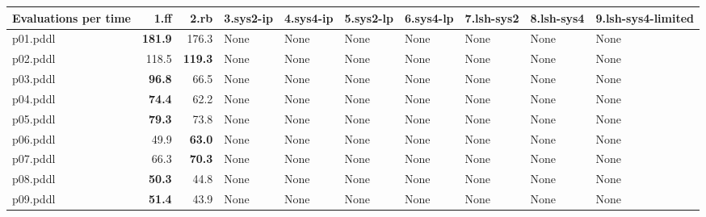 \documentclass{article}
\begin{document}
\begin{tabular}{@{}lrrrrrrrrr@{}}
Evaluations per time & 1.ff & 2.rb & 3.sys2-ip & 4.sys4-ip & 5.sys2-lp & 6.sys4-lp & 7.lsh-sys2 & 8.lsh-sys4 & 9.lsh-sys4-limited \\
\midrule
p01.pddl & \textbf{181.9} & 176.3 & \multicolumn{1}{|l|}{None} & \multicolumn{1}{|l|}{None} & \multicolumn{1}{|l|}{None} & \multicolumn{1}{|l|}{None} & \multicolumn{1}{|l|}{None} & \multicolumn{1}{|l|}{None} & \multicolumn{1}{|l|}{None} \\
p02.pddl & 118.5 & \textbf{119.3} & \multicolumn{1}{|l|}{None} & \multicolumn{1}{|l|}{None} & \multicolumn{1}{|l|}{None} & \multicolumn{1}{|l|}{None} & \multicolumn{1}{|l|}{None} & \multicolumn{1}{|l|}{None} & \multicolumn{1}{|l|}{None} \\
p03.pddl & \textbf{96.8} & 66.5 & \multicolumn{1}{|l|}{None} & \multicolumn{1}{|l|}{None} & \multicolumn{1}{|l|}{None} & \multicolumn{1}{|l|}{None} & \multicolumn{1}{|l|}{None} & \multicolumn{1}{|l|}{None} & \multicolumn{1}{|l|}{None} \\
p04.pddl & \textbf{74.4} & 62.2 & \multicolumn{1}{|l|}{None} & \multicolumn{1}{|l|}{None} & \multicolumn{1}{|l|}{None} & \multicolumn{1}{|l|}{None} & \multicolumn{1}{|l|}{None} & \multicolumn{1}{|l|}{None} & \multicolumn{1}{|l|}{None} \\
p05.pddl & \textbf{79.3} & 73.8 & \multicolumn{1}{|l|}{None} & \multicolumn{1}{|l|}{None} & \multicolumn{1}{|l|}{None} & \multicolumn{1}{|l|}{None} & \multicolumn{1}{|l|}{None} & \multicolumn{1}{|l|}{None} & \multicolumn{1}{|l|}{None} \\
p06.pddl & 49.9 & \textbf{63.0} & \multicolumn{1}{|l|}{None} & \multicolumn{1}{|l|}{None} & \multicolumn{1}{|l|}{None} & \multicolumn{1}{|l|}{None} & \multicolumn{1}{|l|}{None} & \multicolumn{1}{|l|}{None} & \multicolumn{1}{|l|}{None} \\
p07.pddl & 66.3 & \textbf{70.3} & \multicolumn{1}{|l|}{None} & \multicolumn{1}{|l|}{None} & \multicolumn{1}{|l|}{None} & \multicolumn{1}{|l|}{None} & \multicolumn{1}{|l|}{None} & \multicolumn{1}{|l|}{None} & \multicolumn{1}{|l|}{None} \\
p08.pddl & \textbf{50.3} & 44.8 & \multicolumn{1}{|l|}{None} & \multicolumn{1}{|l|}{None} & \multicolumn{1}{|l|}{None} & \multicolumn{1}{|l|}{None} & \multicolumn{1}{|l|}{None} & \multicolumn{1}{|l|}{None} & \multicolumn{1}{|l|}{None} \\
p09.pddl & \textbf{51.4} & 43.9 & \multicolumn{1}{|l|}{None} & \multicolumn{1}{|l|}{None} & \multicolumn{1}{|l|}{None} & \multicolumn{1}{|l|}{None} & \multicolumn{1}{|l|}{None} & \multicolumn{1}{|l|}{None} & \multicolumn{1}{|l|}{None} \\

\end{tabular}
\end{document}
